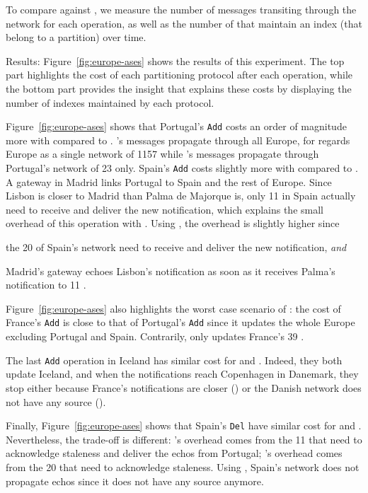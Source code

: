\begin{asparadesc}
    \noindent To compare \NAME against \NAMEC, we measure the number
    of messages transiting through the network for each operation, as
    well as the number of \processes that maintain an index (\ie that
    belong to a partition) over time.
    
  \item[Results:] Figure~\ref{fig:europe-ases} shows the
    results of this experiment. The top part highlights the cost of
    each partitioning protocol after each operation, while the bottom
    part provides the insight that explains these costs by displaying
    the number of indexes maintained by each protocol.

    \noindent Figure~\ref{fig:europe-ases} shows that Portugal's
    \texttt{Add} costs an order of magnitude more with \NAME compared
    to \NAMEC.  \NAME's messages propagate through all Europe, for
    \NAME regards Europe as a single network of 1157 \processes while
    \NAMEC's messages propagate through Portugal's network of 23
    \processes only.
    \noindent  Spain's
    \texttt{Add} costs slightly more with \NAMEC compared to \NAME.  A
    gateway in Madrid links Portugal to Spain and the rest of
    Europe. Since Lisbon is closer to Madrid than Palma de Majorque
    is, only 11 \processes in Spain actually need to receive and
    deliver the new notification, which explains the small overhead of this
    operation with \NAME. Using \NAMEC, the overhead is slightly
    higher since
    \begin{inparaenum}[(i)]
    \item the 20 \processes of Spain's network need to receive and
      deliver the new notification, \emph{and}
    \item Madrid's gateway echoes Lisbon's notification as soon as it
      receives Palma's notification to 11 \processes.
    \end{inparaenum}

    \noindent Figure~\ref{fig:europe-ases} also highlights the worst
    case scenario of \NAME: the cost of France's \texttt{Add} is close
    to that of Portugal's \texttt{Add} since it updates the whole
    Europe excluding Portugal and Spain. Contrarily, \NAMEC only
    updates France's 39 \processes.

    \noindent The last \texttt{Add} operation in Iceland has similar
    cost for \NAME and \NAMEC. Indeed, they both update Iceland, and
    when the notifications reach Copenhagen in Danemark, they stop
    either because France's notifications are closer (\NAME) or the
    Danish network does not have any source (\NAMEC).

    \noindent Finally, Figure~\ref{fig:europe-ases} shows that
    Spain's \texttt{Del} have similar cost for \NAME and
    \NAMEC. Nevertheless, the trade-off is different: \NAME's overhead
    comes from the 11 \nodes that need to acknowledge staleness and
    deliver the echos from Portugal; \NAMEC's overhead comes from the
    20 \nodes that need to acknowledge staleness. Using \NAMEC,
    Spain's network does not propagate echos since it does not have
    any source anymore.

\end{asparadesc}

